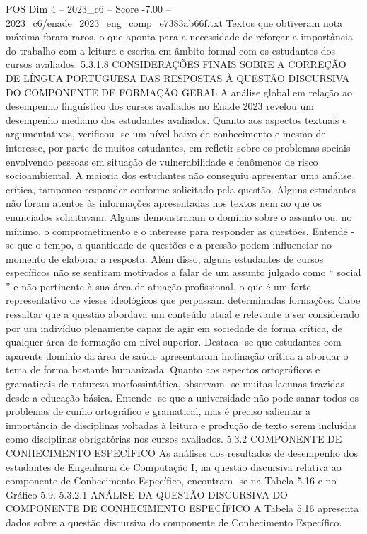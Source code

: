 \begin{textsample}{POS Dim 4 – 2023\_c6 – Score -7.00 – 2023\_c6/enade\_2023\_eng\_comp\_e7383ab66f.txt}
Textos que obtiveram nota máxima foram raros, o que aponta para a necessidade de reforçar a importância do trabalho com a leitura e escrita em âmbito formal com os estudantes dos cursos avaliados. 5.3.1.8 CONSIDERAÇÕES FINAIS SOBRE A CORREÇÃO DE LÍNGUA PORTUGUESA DAS RESPOSTAS À QUESTÃO DISCURSIVA DO COMPONENTE DE FORMAÇÃO GERAL A análise global em relação ao desempenho linguístico dos cursos avaliados no Enade 2023 revelou um desempenho mediano dos estudantes avaliados.
Quanto aos aspectos textuais e argumentativos, verificou -se um nível baixo de conhecimento e mesmo de interesse, por parte de muitos estudantes, em refletir sobre os problemas sociais envolvendo pessoas em situação de vulnerabilidade e fenômenos de risco socioambiental.
A maioria dos estudantes não conseguiu apresentar uma análise crítica, tampouco responder conforme solicitado pela questão.
Alguns estudantes não foram atentos às informações apresentadas nos textos nem ao que os enunciados solicitavam.
Alguns demonstraram o domínio sobre o assunto ou, no mínimo, o comprometimento e o interesse para responder as questões.
Entende -se que o tempo, a quantidade de questões e a pressão podem influenciar no momento de elaborar a resposta.
Além disso, alguns estudantes de cursos específicos não se sentiram motivados a falar de um assunto julgado como “ social ” e não pertinente à sua área de atuação profissional, o que é um forte representativo de vieses ideológicos que perpassam determinadas formações.
Cabe ressaltar que a questão abordava um conteúdo atual e relevante a ser considerado por um indivíduo plenamente capaz de agir em sociedade de forma crítica, de qualquer área de formação em nível superior.
Destaca -se que estudantes com aparente domínio da área de saúde apresentaram inclinação crítica a abordar o tema de forma bastante humanizada.
Quanto aos aspectos ortográficos e gramaticais de natureza morfossintática, observam -se muitas lacunas trazidas desde a educação básica.
Entende -se que a universidade não pode sanar todos os problemas de cunho ortográfico e gramatical, mas é preciso salientar a importância de disciplinas voltadas à leitura e produção de texto serem incluídas como disciplinas obrigatórias nos cursos avaliados. 5.3.2 COMPONENTE DE CONHECIMENTO ESPECÍFICO As análises dos resultados de desempenho dos estudantes de Engenharia de Computação I, na questão discursiva relativa ao componente de Conhecimento Específico, encontram -se na Tabela 5.16 e no Gráfico 5.9. 5.3.2.1 ANÁLISE DA QUESTÃO DISCURSIVA DO COMPONENTE DE CONHECIMENTO ESPECÍFICO A Tabela 5.16 apresenta dados sobre a questão discursiva do componente de Conhecimento Específico.

\end{textsample}
